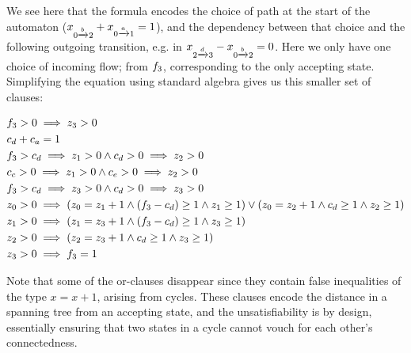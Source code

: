 \documentclass[acmsmall,review,anonymous]{acmart}\settopmatter{printfolios=true,printccs=false,printacmref=true}
\theoremstyle{definition}
\begin{document}
  We see here that the formula encodes the choice of path at the start of the
  automaton ($x_{0 \xrightarrow{b} 2} +
  x_{0 \xrightarrow{a} 1} = 1$), and the dependency between that
  choice and the following outgoing transition, e.g. in
  $x_{2 \xrightarrow{d} 3} -
  x_{0 \xrightarrow{b} 2} = 0$. Here we only have one choice of
  incoming flow; from $f_3$, corresponding to the only accepting
  state. Simplifying the equation using standard algebra gives us this smaller
  set of clauses:

  \begin{equation}
    \begin{aligned}
    &f_{3} > 0 \implies z_{3} > 0\\
    & c_{d} + c_{a} = 1\\
    & f_{3}  > c_{d} \implies z_{1} > 0 \land c_{d} > 0 \implies z_{2} > 0\\
    &c_{c} > 0 \implies z_{1} > 0 \land c_{e} > 0 \implies z_{2} > 0\\
    &f_{3}  > c_{d} \implies z_{3} > 0 \land c_{d} > 0 \implies z_{3} > 0\\
    &z_{0} > 0 \implies \left(z_{0} = z_{1} + 1 \land (f_{3}  - c_{d}) \geq 1 \land z_{1} \geq 1\right) \lor \left(z_{0} = z_{2} + 1 \land c_{d} \geq 1 \land z_{2} \geq 1\right)\\
    &z_{1} > 0 \implies \left(z_{1} = z_{3} + 1 \land (f_{3}  - c_{d}) \geq 1 \land z_{3} \geq 1\right)\\
    &z_{2} > 0 \implies \left(z_{2} = z_{3} + 1 \land c_{d} \geq 1 \land z_{3} \geq 1\right)\\
    &z_{3} > 0 \implies f_{3} = 1
    \end{aligned}
    \label{eq:parikh-formula:reduced}
    \end{equation}
  
Note that some of the or-clauses disappear since they contain false
inequalities of the type $x = x + 1$, arising from cycles. These clauses encode
the distance in a spanning tree from an accepting state, and the
unsatisfiability is by design, essentially ensuring that two states in a cycle
cannot vouch for each other's connectedness.
\end{document}
